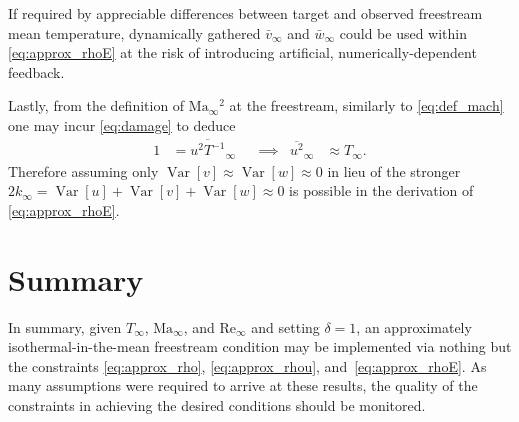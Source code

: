 \documentclass[letterpaper,11pt,nointlimits,reqno]{amsart}
\newcommand{\Mach}[1][]{\mbox{Ma}_{#1}}
\newcommand{\Reynolds}[1][]{\mbox{Re}_{#1}}
\newcommand{\Var}[1]{\ensuremath{\operatorname{Var}\left[{#1}\right]}}
\begin{document}
If required by appreciable differences between target and observed freestream
mean temperature, dynamically gathered $\bar{v}_\infty$ and $\bar{w}_\infty$
could be used within \eqref{eq:approx_rhoE} at the risk of introducing
artificial, numerically-dependent feedback.

Lastly, from the definition of $\Mach[\infty]{}^2$ at the freestream, similarly
to \eqref{eq:def_mach} one may incur \eqref{eq:damage} to deduce
\begin{align}
  \label{eq:def_mach2}
  1 &= \overline{u^2 T^{-1}}_\infty
  &
  &\implies
  &
  \overline{u^2}_\infty &\approx T_\infty
  .
\end{align}
Therefore assuming only $\Var{v} \approx \Var{w} \approx 0$ in lieu of the
stronger $2 k_\infty = \Var{u} + \Var{v} + \Var{w} \approx 0$ is possible
in the derivation of \eqref{eq:approx_rhoE}.

\section{Summary}

In summary, given $T_\infty$, $\Mach[\infty]{}$, and $\Reynolds[\infty]{}$ and
setting $\delta=1$, an approximately isothermal-in-the-mean freestream
condition may be implemented via nothing but the constraints
\eqref{eq:approx_rho}, \eqref{eq:approx_rhou}, and~\eqref{eq:approx_rhoE}.  As
many assumptions were required to arrive at these results, the quality of the
constraints in achieving the desired conditions should be monitored.
\end{document}
